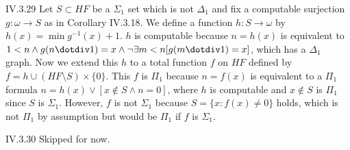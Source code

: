 \documentclass[12pt]{article}
\begin{document}
\begin{customthm}{IV.3.29}
  Let $S\subset HF$ be a $\Sigma_1$ set which is not $\Delta_1$ and fix a computable surjection $g:\omega\rightarrow S$ as in Corollary IV.3.18. We define a function $h:S\rightarrow\omega$ by $h(x)=\min g^{-1}(x)+1$. $h$ is computable because $n=h(x)$ is equivalent to $1<n\wedge g(n\dotdiv1)=x\wedge\neg\exists m<n[g(m\dotdiv1)=x]$, which has a $\Delta_1$ graph. Now we extend this $h$ to a total function $f$ on $HF$ defined by $f=h\cup(HF\setminus S)\times\{0\}$. This $f$ is $\Pi_1$ because $n=f(x)$ is equivalent to a $\Pi_1$ formula $n=h(x)\vee[x\not\in S\wedge n=0]$, where $h$ is computable and $x\not\in S$ is $\Pi_1$ since $S$ is $\Sigma_1$. However, $f$ is not $\Sigma_1$ because $S=\{x:f(x)\neq0\}$ holds, which is not $\Pi_1$ by assumption but would be $\Pi_1$ if $f$ is $\Sigma_1$.
\end{customthm}

\begin{customthm}{IV.3.30}
  Skipped for now.
\end{customthm}
\end{document}
